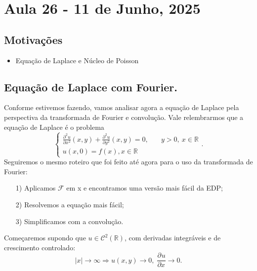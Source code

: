 \documentclass[../pde_notes.tex]{subfiles}
\begin{document}
\section{Aula 26 - 11 de Junho, 2025}
\subsection{Motivações}
\begin{itemize}
	\item Equação de Laplace e Núcleo de Poisson
\end{itemize}
\subsection{Equação de Laplace com Fourier.}
Conforme estivemos fazendo, vamos analisar agora a equação de Laplace pela perspectiva da transformada de Fourier e convolução. Vale relembrarmos que a equação de Laplace é o problema
\[
	\left\{\begin{array}{ll}
		\frac{\partial^{2}u}{\partial x^{2}}(x, y) + \frac{\partial^{2}u}{\partial y^{2}}(x, y)=0, & \quad y>0,\: x\in \mathbb{R} \\
		u(x, 0) = f(x), x\in \mathbb{R}
	\end{array}\right..
\]
Seguiremos o mesmo roteiro que foi feito até agora para o uso da transformada de Fourier:
\begin{itemize}
	\item[1)] Aplicamos \(\mathcal{F}\) em x e encontramos uma versão mais fácil da EDP;
	\item[2)] Resolvemos a equação mais fácil;
	\item[3)] Simplificamos com a convolução.
\end{itemize}
Começaremos supondo que \(u\in \mathcal{C}^{2}(\mathbb{R})\), com derivadas integráveis e de crescimento controlado:
\[
	|x|\rightarrow \infty \Rightarrow u(x,y)\rightarrow 0,\; \frac{\partial^{}u}{\partial x^{}}\rightarrow 0.
\]
\end{document}
